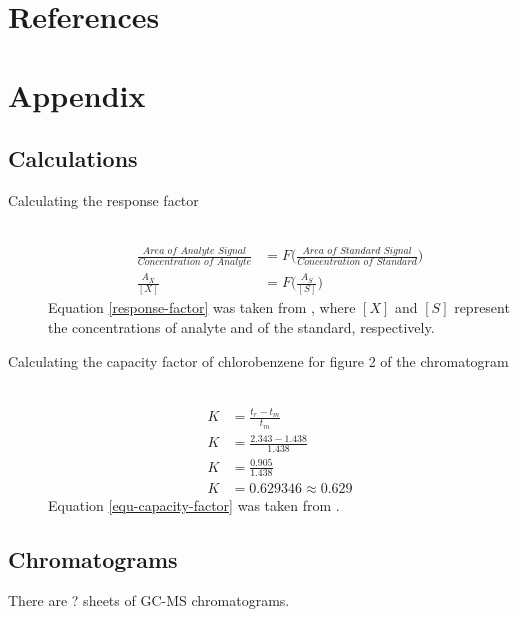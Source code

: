\documentclass[a4paper, 12pt]{article}
\begin{document}

\section{References}
\printbibliography


\section{Appendix}

\subsection{Calculations}


\begin{description}

	\item[Calculating the response factor] \hfill \\
		\begin{equation} \label{response-factor}
			\begin{split}
				\frac{\textit{Area of Analyte Signal}}{\textit{Concentration of Analyte}} & = F\Bigg(\frac{\textit{Area of Standard Signal}}{\textit{Concentration of Standard}}\Bigg) \\
				\frac{A_X}{[X]} & = F\Bigg(\frac{A_S}{[S]}\Bigg)
			\end{split}
		\end{equation}
		Equation \ref{response-factor} was taken from \cite{harris}, where $[X]$ and $[S]$ represent the concentrations of analyte and of the standard, respectively.

	\item[Calculating the capacity factor of chlorobenzene for figure 2 of the chromatogram] \hfill \\
		\begin{equation} \label{equ-capacity-factor}
			\begin{split}
				K & = \frac{t_r - t_m}{t_m} \\
				K & = \frac{2.343 - 1.438}{1.438} \\
				K & = \frac{0.905}{1.438} \\
				K & = 0.629346 \approx 0.629
			\end{split}
		\end{equation}
		Equation \ref{equ-capacity-factor} was taken from \cite{harris}.

\end{description}


\subsection{Chromatograms}
There are ? sheets of GC-MS chromatograms.

\end{document}
